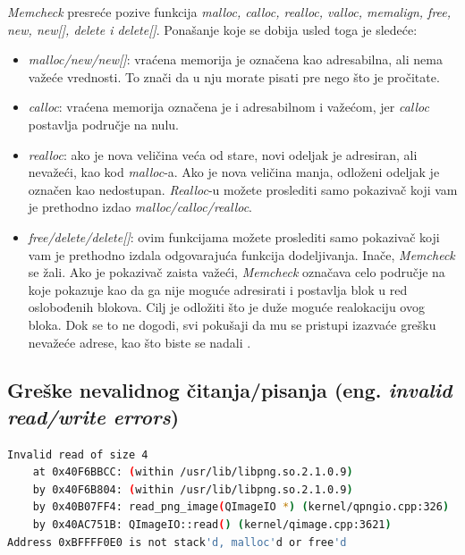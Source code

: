 \documentclass[12pt,oneside]{memoir}
\theoremstyle{plain}
\theoremstyle{definition}
\begin{document}
\textit{Memcheck} presreće pozive funkcija \textit{malloc, calloc, realloc, valloc, memalign, free, new, new[], delete i delete[]}. Ponašanje koje  se dobija usled toga je sledeće:
\begin{itemize}
\item \textit{malloc/new/new[]}: vraćena memorija je označena kao adresabilna, ali nema važeće vrednosti. To znači da u nju morate pisati pre nego što je pročitate.
\item \textit{calloc}: vraćena memorija označena je i adresabilnom i važećom, jer \textit{calloc} postavlja područje na nulu.
\item \textit{realloc}: ako je nova veličina veća od stare, novi odeljak je adresiran, ali nevažeći, kao kod \textit{malloc}-a. Ako je nova veličina manja, odloženi odeljak je označen kao nedostupan. \textit{Realloc}-u možete proslediti samo pokazivač koji vam je prethodno izdao \textit{malloc/calloc/realloc}.
\item \textit{free/delete/delete[]}: ovim funkcijama možete proslediti samo pokazivač koji vam je prethodno izdala odgovarajuća funkcija dodeljivanja. Inače, \textit{Memcheck} se žali. Ako je pokazivač zaista važeći, \textit{Memcheck} označava celo područje na koje pokazuje kao da ga nije moguće adresirati i postavlja blok u red oslobođenih blokova. Cilj je odložiti što je duže moguće realokaciju ovog bloka. Dok se to ne dogodi, svi pokušaji da mu se pristupi izazvaće grešku nevažeće adrese, kao što biste se nadali \cite{Memcheck}. 
\end{itemize}

\subsection{Greške nevalidnog čitanja/pisanja (eng. \textit{invalid read/write errors})}

\begin{lstlisting}[style=terminal,caption={Primer ispisa greške nevalidnog čitanja, izvor: \cite{Memcheck}}, label={lst:slika2.3},language={bash}]   
Invalid read of size 4
    at 0x40F6BBCC: (within /usr/lib/libpng.so.2.1.0.9)
    by 0x40F6B804: (within /usr/lib/libpng.so.2.1.0.9)
    by 0x40B07FF4: read_png_image(QImageIO *) (kernel/qpngio.cpp:326)
    by 0x40AC751B: QImageIO::read() (kernel/qimage.cpp:3621)
Address 0xBFFFF0E0 is not stack'd, malloc'd or free'd
\end{lstlisting}
\end{document}
